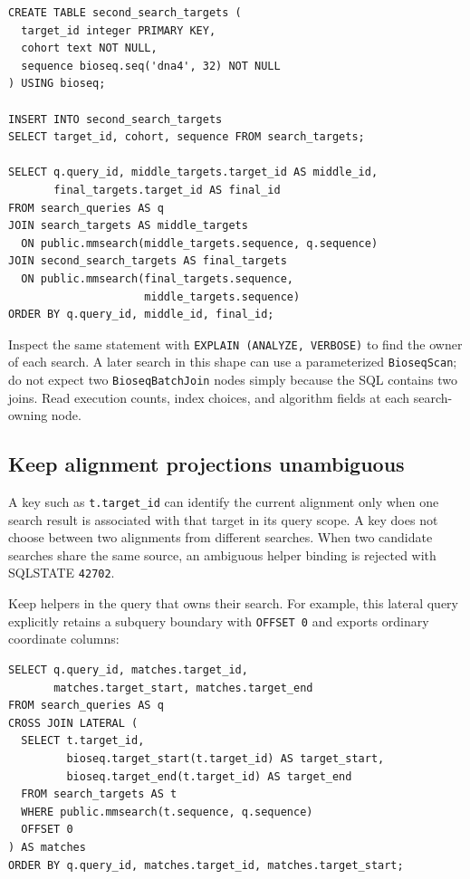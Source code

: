 \par\noindent\begin{minipage}{\linewidth}
\begin{lstlisting}[style=bioseq-appendix-sql]
CREATE TABLE second_search_targets (
  target_id integer PRIMARY KEY,
  cohort text NOT NULL,
  sequence bioseq.seq('dna4', 32) NOT NULL
) USING bioseq;

INSERT INTO second_search_targets
SELECT target_id, cohort, sequence FROM search_targets;

SELECT q.query_id, middle_targets.target_id AS middle_id,
       final_targets.target_id AS final_id
FROM search_queries AS q
JOIN search_targets AS middle_targets
  ON public.mmsearch(middle_targets.sequence, q.sequence)
JOIN second_search_targets AS final_targets
  ON public.mmsearch(final_targets.sequence,
                     middle_targets.sequence)
ORDER BY q.query_id, middle_id, final_id;
\end{lstlisting}
\end{minipage}

Inspect the same statement with \texttt{EXPLAIN (ANALYZE, VERBOSE)} to
find the owner of each search. A later search in this shape can use a
parameterized \texttt{BioseqScan}; do not expect two
\texttt{BioseqBatchJoin} nodes simply because the SQL contains two joins.
Read execution counts, index choices, and algorithm fields at each
search-owning node.

\subsection{Keep alignment projections unambiguous}

A key such as \texttt{t.target\_id} can identify the current alignment
only when one search result is associated with that target in its query
scope. A key does not choose between two alignments from different
searches. When two candidate searches share the same source, an ambiguous
helper binding is rejected with SQLSTATE \texttt{42702}.

Keep helpers in the query that owns their search. For example, this
lateral query explicitly retains a subquery boundary with \texttt{OFFSET 0}
and exports ordinary coordinate columns:

\par\noindent\begin{minipage}{\linewidth}
\begin{lstlisting}[style=bioseq-appendix-sql]
SELECT q.query_id, matches.target_id,
       matches.target_start, matches.target_end
FROM search_queries AS q
CROSS JOIN LATERAL (
  SELECT t.target_id,
         bioseq.target_start(t.target_id) AS target_start,
         bioseq.target_end(t.target_id) AS target_end
  FROM search_targets AS t
  WHERE public.mmsearch(t.sequence, q.sequence)
  OFFSET 0
) AS matches
ORDER BY q.query_id, matches.target_id, matches.target_start;
\end{lstlisting}
\end{minipage}


